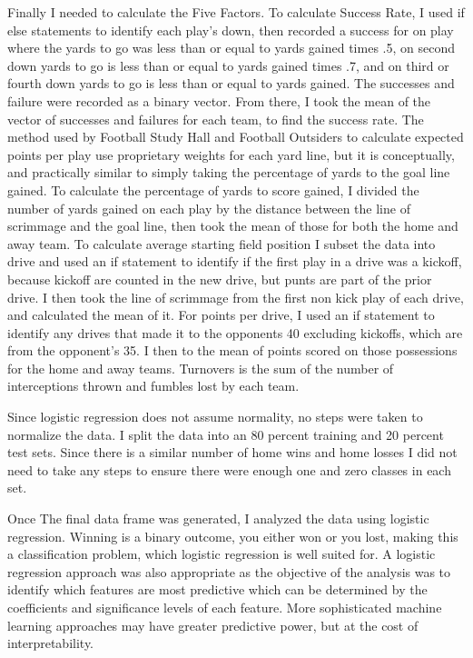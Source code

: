\documentclass[12pt,english]{article}
\begin{document}
Finally I needed to calculate the Five Factors. To calculate Success Rate, I used if else statements to identify each play's down, then recorded a success for on play where the yards to go was less than or equal to yards gained times .5, on second down yards to go is less than or equal to yards gained times .7, and on third or fourth down yards to go is less than or equal to yards gained.  The successes and failure were recorded as a binary vector.  From there, I took the mean of the vector of successes and failures for each team, to find the success rate.  The method used by Football Study Hall and Football Outsiders to calculate expected points per play use proprietary weights for each yard line, but it is conceptually, and practically similar to simply taking the percentage of yards to the goal line gained.  To calculate the percentage of yards to score gained, I divided the number of yards gained on each play by the distance between the line of scrimmage and the goal line, then took the mean of those for both the home and away team.  To calculate average starting field position I subset the data into drive and used an if statement to identify if the first play in a drive was a kickoff, because kickoff are counted in the new drive, but punts are part of the prior drive.  I then took the line of scrimmage from the first non kick play of each drive, and calculated the mean of it.   For points per drive, I used an if statement to identify any drives that made it to the opponents 40 excluding kickoffs, which are from the opponent's 35.  I then to the mean of points scored on those possessions for the home and away teams.  Turnovers is the sum of the number of interceptions thrown and fumbles lost by each team. 

Since logistic regression does not assume normality, no steps were taken to normalize the data.  I split the data into an 80 percent training and 20 percent test sets.  Since there is a similar number of home wins and home losses I did not need to take any steps to ensure there were enough one and zero classes in each set.  

Once The final data frame was generated, I analyzed the data using logistic regression.  Winning is a binary outcome, you either won or you lost, making this a classification problem, which logistic regression is well suited for.  A logistic regression approach was also appropriate as the objective of the analysis was to identify which features are most predictive which can be determined by the coefficients and significance levels of each feature.  More sophisticated machine learning approaches may have greater predictive power, but at the cost of interpretability.
\end{document}
